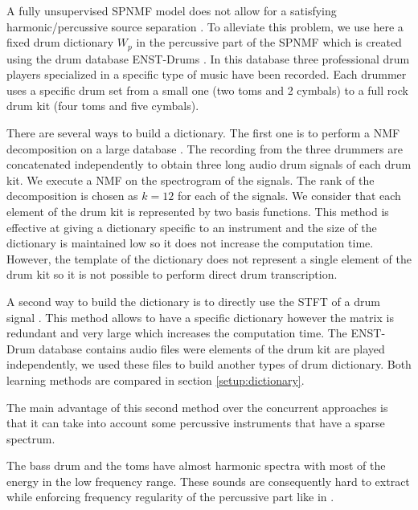 \documentclass[journal]{IEEEtran}
\begin{document}
A fully unsupervised SPNMF model does not allow for a satisfying harmonic/percussive source separation \cite{laroche2015structured}. To alleviate this problem, we use here a fixed drum dictionary $W_p$ in the percussive part of the SPNMF which is created using the drum database ENST-Drums \cite{gillet2006enst}. In this database three professional drum players specialized in a specific type of music have been recorded. Each drummer uses a specific drum set from a small one (two toms and 2 cymbals) to a full rock drum kit (four toms and five cymbals). 

There are several ways to build a dictionary. The first one is to perform a NMF decomposition on a large database \cite{jaureguiberry2011adaptation}. The recording from the three drummers are concatenated independently to obtain three long audio drum signals of each drum kit. We execute a NMF on the spectrogram of the signals. The rank of the decomposition is chosen as $k=12$ for each of the signals. We consider that each element of the drum kit is represented by two basis functions. This method is effective at giving a dictionary specific to an instrument and the size of the dictionary is maintained low so it does not increase the computation time. However, the template of the dictionary does not represent a single element of the drum kit so it is not possible to perform direct drum transcription.

A second way to build the dictionary is to directly use the STFT of a drum signal \cite{wudrum}. This method allows to have a specific dictionary however the matrix is redundant and very large which increases the computation time. The ENST-Drum database contains audio files were elements of the drum kit are played independently, we used these files to build another types of drum dictionary. 
Both learning methods are compared in section \ref{setup:dictionary}.


The main advantage of this second method over the concurrent approaches is that it can take into account some percussive instruments that have a sparse spectrum. 

The bass drum and the toms have almost harmonic spectra with most of the energy in the low frequency range. These sounds are consequently hard to extract while enforcing frequency regularity of the percussive part like in \cite{canadas2014percussive,ono2008separation}.
\end{document}
